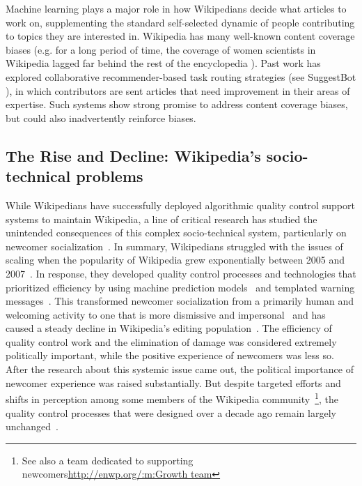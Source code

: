 Machine learning plays a major role in how Wikipedians decide what articles to work on, supplementing the standard self-selected dynamic of people contributing to topics they are interested in. Wikipedia has many well-known content coverage biases (e.g. for a long period of time, the coverage of women scientists in Wikipedia lagged far behind the rest of the encyclopedia \cite{halfaker2017interpolating}). Past work has explored collaborative recommender-based task routing strategies (see SuggestBot \cite{cosley2007suggestbot}), in which contributors are sent articles that need improvement in their areas of expertise. Such systems show strong promise to address content coverage biases, but could also inadvertently reinforce biases.

\subsection{The Rise and Decline: Wikipedia's socio-technical problems}
While Wikipedians have successfully deployed algorithmic quality control support systems to maintain Wikipedia, a line of critical research has studied the unintended consequences of this complex socio-technical system, particularly on newcomer socialization~\cite{halfaker2013rise,morgan2013tea,halfaker2014snuggle}.  In summary, Wikipedians struggled with the issues of scaling when the popularity of Wikipedia grew exponentially between 2005 and 2007~\cite{halfaker2013rise}.  In response, they developed quality control processes and technologies that prioritized efficiency by using machine prediction models~\cite{halfaker2014snuggle} and templated warning messages~\cite{halfaker2013rise}.  This transformed newcomer socialization from a primarily human and welcoming activity to one that is more dismissive and impersonal~\cite{morgan2013tea} and has caused a steady decline in Wikipedia's editing population~\cite{halfaker2013rise}.  The efficiency of quality control work and the elimination of damage was considered extremely politically important, while the positive experience of newcomers was less so. After the research about this systemic issue came out, the political importance of newcomer experience was raised substantially.  But despite targeted efforts and shifts in perception among some members of the Wikipedia community~\cite{narayan2015effects, morgan2013tea}\footnote{See also a team dedicated to supporting newcomers\url{http://enwp.org/:m:Growth team}}, the quality control processes that were designed over a decade ago remain largely unchanged~\cite{halfaker2014snuggle}.


